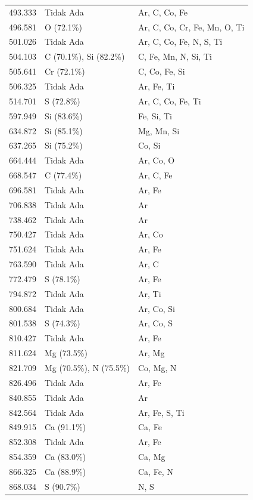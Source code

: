 \begin{onehalfspace}
\begin{longtable}{p{}p{}p{}}
        493.333 & Tidak Ada & Ar, C, Co, Fe \\
        496.581 & O (72.1\%) & Ar, C, Co, Cr, Fe, Mn, O, Ti \\
        501.026 & Tidak Ada & Ar, C, Co, Fe, N, S, Ti \\
        504.103 & C (70.1\%), Si (82.2\%) & C, Fe, Mn, N, Si, Ti \\
        505.641 & Cr (72.1\%) & C, Co, Fe, Si \\
        506.325 & Tidak Ada & Ar, Fe, Ti \\
        514.701 & S (72.8\%) & Ar, C, Co, Fe, Ti \\
        597.949 & Si (83.6\%) & Fe, Si, Ti \\
        634.872 & Si (85.1\%) & Mg, Mn, Si \\
        637.265 & Si (75.2\%) & Co, Si \\
        664.444 & Tidak Ada & Ar, Co, O \\
        668.547 & C (77.4\%) & Ar, C, Fe \\
        696.581 & Tidak Ada & Ar, Fe \\
        706.838 & Tidak Ada & Ar \\
        738.462 & Tidak Ada & Ar \\
        750.427 & Tidak Ada & Ar, Co \\
        751.624 & Tidak Ada & Ar, Fe \\
        763.590 & Tidak Ada & Ar, C \\
        772.479 & S (78.1\%) & Ar, Fe \\
        794.872 & Tidak Ada & Ar, Ti \\
        800.684 & Tidak Ada & Ar, Co, Si \\
        801.538 & S (74.3\%) & Ar, Co, S \\
        810.427 & Tidak Ada & Ar, Fe \\
        811.624 & Mg (73.5\%) & Ar, Mg \\
        821.709 & Mg (70.5\%), N (75.5\%) & Co, Mg, N \\
        826.496 & Tidak Ada & Ar, Fe \\
        840.855 & Tidak Ada & Ar \\
        842.564 & Tidak Ada & Ar, Fe, S, Ti \\
        849.915 & Ca (91.1\%) & Ca, Fe \\
        852.308 & Tidak Ada & Ar, Fe \\
        854.359 & Ca (83.0\%) & Ca, Mg \\
        866.325 & Ca (88.9\%) & Ca, Fe, N \\
        868.034 & S (90.7\%) & N, S \\
\end{longtable}





\end{onehalfspace}
